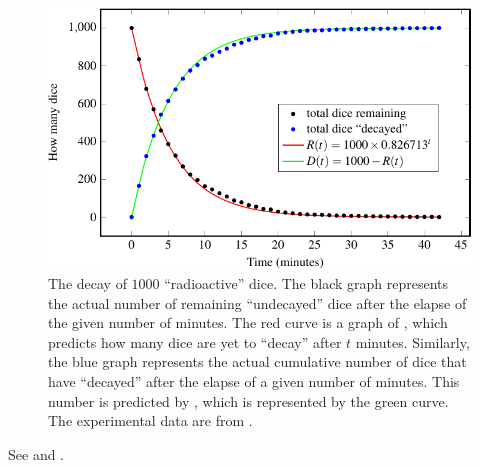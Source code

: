 \documentclass[a4paper,oneside,12pt]{article}
\begin{document}
\begin{problem}
{\begin{solution}
\begin{figure}[!htbp]
\centering
\includegraphics[scale=1.1]{image/11/radioactive-dice.pdf}
\caption{%
  The decay of $1000$ ``radioactive'' dice.  The black graph
  represents the actual number of remaining ``undecayed'' dice after
  the elapse of the given number of minutes.  The red curve is a graph
  of
  ,
  which predicts how many dice are yet to ``decay'' after $t$
  minutes.  Similarly, the blue graph represents the actual cumulative
  number of dice that have ``decayed'' after the elapse of a given
  number of minutes.  This number is predicted by
  , which is
  represented by the green curve.  The experimental data are from
  .
}
\label{fig:exponential:radioactive_dice}
\end{figure}

See  and
.

\begin{table}[!htbp]
\centering

\caption{%
  This is the same as , but
  with the addition of columns for the cumulative sum of dice that
  have ``decayed''.
}
\label{tab:exponential:radioactive_dice_cumulative_decayed}
\end{table}


\end{solution}}
\end{problem}
\end{document}
